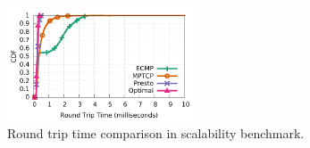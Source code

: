 \begin{figure}[!t]
        \centering
  \includegraphics[width=0.5\textwidth]{presto/figures/scalability_test/scalability_compare_latency.pdf}
        \caption{Round trip time comparison in scalability benchmark. 
		}
        \label{micro_scalability_test_latency}
\end{figure}


